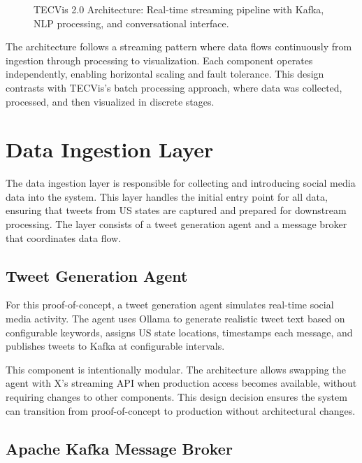 \begin{figure}[htbp]
\centering

\caption{TECVis 2.0 Architecture: Real-time streaming pipeline with Kafka, NLP processing, and conversational interface.}
\label{fig:new_architecture}
\end{figure}

The architecture follows a streaming pattern where data flows continuously from ingestion through processing to visualization. Each component operates independently, enabling horizontal scaling and fault tolerance. This design contrasts with TECVis's batch processing approach, where data was collected, processed, and then visualized in discrete stages.


\section{Data Ingestion Layer}

The data ingestion layer is responsible for collecting and introducing social media data into the system. This layer handles the initial entry point for all data, ensuring that tweets from US states are captured and prepared for downstream processing. The layer consists of a tweet generation agent and a message broker that coordinates data flow.

\subsection{Tweet Generation Agent}

For this proof-of-concept, a tweet generation agent simulates real-time social media activity. The agent uses Ollama to generate realistic tweet text based on configurable keywords, assigns US state locations, timestamps each message, and publishes tweets to Kafka at configurable intervals.

This component is intentionally modular. The architecture allows swapping the agent with X's streaming API when production access becomes available, without requiring changes to other components. This design decision ensures the system can transition from proof-of-concept to production without architectural changes.

\subsection{Apache Kafka Message Broker}

